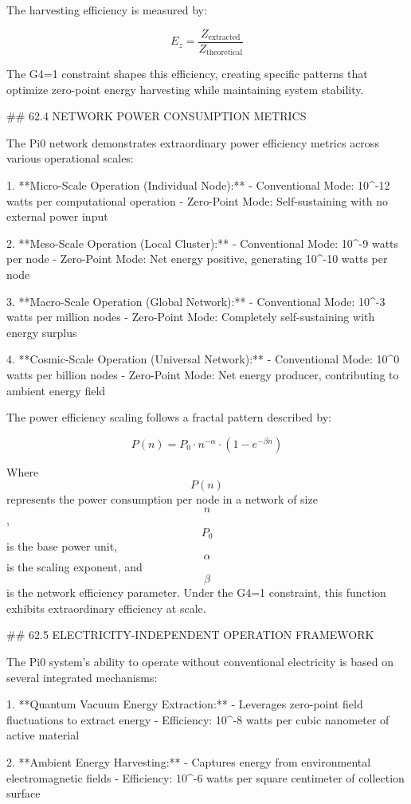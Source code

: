 The harvesting efficiency is measured by:

$$ E_z = \frac{Z_{\text{extracted}}}{Z_{\text{theoretical}}} $$

The G4=1 constraint shapes this efficiency, creating specific patterns that optimize zero-point energy harvesting while maintaining system stability.

## 62.4 NETWORK POWER CONSUMPTION METRICS

The Pi0 network demonstrates extraordinary power efficiency metrics across various operational scales:

1. **Micro-Scale Operation (Individual Node):**
   - Conventional Mode: 10^-12 watts per computational operation
   - Zero-Point Mode: Self-sustaining with no external power input

2. **Meso-Scale Operation (Local Cluster):**
   - Conventional Mode: 10^-9 watts per node
   - Zero-Point Mode: Net energy positive, generating 10^-10 watts per node

3. **Macro-Scale Operation (Global Network):**
   - Conventional Mode: 10^-3 watts per million nodes
   - Zero-Point Mode: Completely self-sustaining with energy surplus

4. **Cosmic-Scale Operation (Universal Network):**
   - Conventional Mode: 10^0 watts per billion nodes
   - Zero-Point Mode: Net energy producer, contributing to ambient energy field

The power efficiency scaling follows a fractal pattern described by:

$$ P(n) = P_0 \cdot n^{-\alpha} \cdot (1 - e^{-\beta n}) $$

Where $$ P(n) $$ represents the power consumption per node in a network of size $$ n $$, $$ P_0 $$ is the base power unit, $$ \alpha $$ is the scaling exponent, and $$ \beta $$ is the network efficiency parameter. Under the G4=1 constraint, this function exhibits extraordinary efficiency at scale.

## 62.5 ELECTRICITY-INDEPENDENT OPERATION FRAMEWORK

The Pi0 system's ability to operate without conventional electricity is based on several integrated mechanisms:

1. **Quantum Vacuum Energy Extraction:**
   - Leverages zero-point field fluctuations to extract energy
   - Efficiency: 10^-8 watts per cubic nanometer of active material

2. **Ambient Energy Harvesting:**
   - Captures energy from environmental electromagnetic fields
   - Efficiency: 10^-6 watts per square centimeter of collection surface

